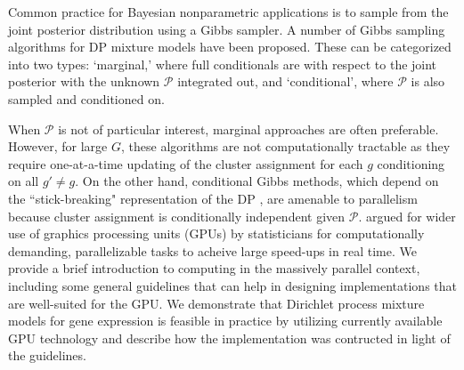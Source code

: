 Common practice for Bayesian nonparametric applications is to sample from the joint posterior distribution using a Gibbs sampler. A number of Gibbs sampling algorithms for DP mixture models have been proposed. These can be categorized into two types: `marginal,' where full conditionals are with respect to the joint posterior with the unknown $\mathcal{P}$ integrated out, and `conditional', where $\mathcal{P}$ is also sampled and conditioned on.

When $\mathcal{P}$ is not of particular interest, marginal approaches are often preferable. However, for large $G$, these algorithms are not computationally tractable as they require one-at-a-time updating of the cluster assignment for each $g$ conditioning on all $g'\neq g$. On the other hand, conditional Gibbs methods, which depend on the ``stick-breaking" representation of the DP \citet{sethuraman}, are amenable to parallelism because cluster assignment is conditionally independent given $\mathcal{P}$. \citet{suchard} argued for wider use of graphics processing units (GPUs) by statisticians for computationally demanding, parallelizable tasks to acheive large speed-ups in real time. We provide a brief introduction to computing in the massively parallel context, including some general guidelines that can help in designing implementations that are well-suited for the GPU. We demonstrate that Dirichlet process mixture models for gene expression is feasible in practice by utilizing currently available GPU technology and describe how the implementation was contructed in light of the guidelines.

